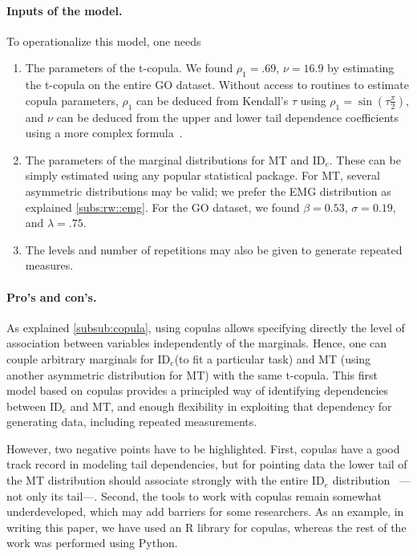 \documentclass[manuscript,review,anonymous]{acmart}
\newcommand{\ide}{\ensuremath{{\text{ID}_e}}\xspace}
\begin{document}
\paragraph{Inputs of the model.} To operationalize this model, one needs
\begin{enumerate}
	\item The parameters of the t-copula. We found $\rho_1 = .69$, $\nu = 16.9$ by estimating the t-copula on the entire GO dataset. Without access to routines to estimate copula parameters, $\rho_1$ can be deduced from Kendall's $\tau$ using $\rho_1 = \sin(\tau \frac{\pi}{2})$, and $\nu$ can be deduced from the upper and lower tail dependence coefficients using a more complex formula~\cite[Section 3]{demarta2005}.
	\item The parameters of the marginal distributions for MT and \ide. These can be simply estimated using any popular statistical package. For MT, several asymmetric distributions may be valid; we prefer the EMG distribution as explained \autoref{subs:rw::emg}. For the GO dataset, we found $\beta = 0.53$, $\sigma = 0.19$, and $\lambda= .75$.
	\item The levels and number of repetitions may also be given to generate repeated measures.
\end{enumerate}


\paragraph{Pro's and con's.} As explained \autoref{subsub:copula}, using copulas allows specifying directly the level of association between variables independently of the marginals. Hence, one can couple arbitrary marginals for \ide (\eg to fit a particular task) and MT (\eg using another asymmetric distribution for MT) with the same t-copula.
This first model based on copulas provides a principled way of identifying dependencies between \ide and MT, and enough flexibility in exploiting that dependency for generating data, including repeated measurements.

However, two negative points have to be highlighted. First, copulas have a good track record in modeling tail dependencies, but for pointing data the lower tail of the MT distribution should associate strongly with the entire \ide distribution~\cite{gori2018tochi} ---not only its tail---. Second, the tools to work with copulas remain somewhat underdeveloped, which may add barriers for some researchers. As an example, in writing this paper, we have used an R library for copulas, whereas the rest of the work was performed using Python.
\end{document}
